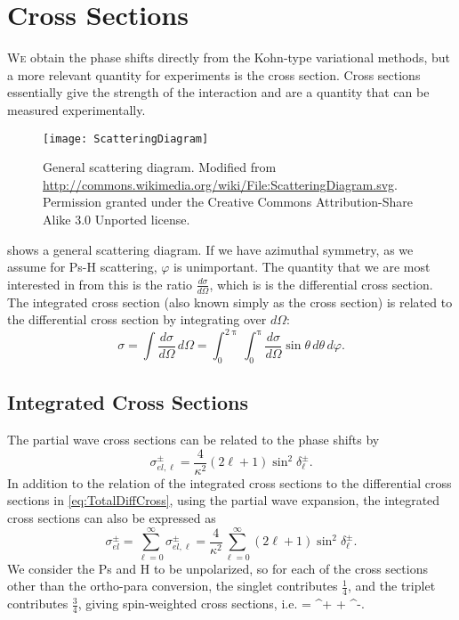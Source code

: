 \documentclass[Dissertation.tex]{subfiles}
\begin{document}
\clearpage
\pagebreak
\newpage

\chapter{Cross Sections}
\label{chp:CrossSections}

\lettrine{\textcolor{startcolor}{W}}{e} obtain the phase shifts directly from 
the Kohn-type variational methods, but a more relevant quantity for 
experiments is the cross section. Cross sections essentially give the 
strength of the interaction and are a quantity that can be measured 
experimentally.

\begin{figure}
	\centering
	\texttt{[image: ScatteringDiagram]}
	\caption[General scattering diagram]{General scattering diagram. Modified from \url{http://commons.wikimedia.org/wiki/File:ScatteringDiagram.svg}. Permission granted under the Creative Commons Attribution-Share Alike 3.0 Unported license.}
	\label{fig:ScatteringDiagram}
\end{figure}

 shows a general scattering diagram. If we have
azimuthal symmetry, as we assume for Ps-H scattering, $\varphi$ is unimportant.
The quantity that we are most interested in from this is the ratio
$\frac{d\sigma}{d\Omega}$, which is is the differential cross section.
The integrated cross section (also known simply as the cross section) is
related to the differential cross section by integrating over $d\Omega$:
\begin{equation}
\label{eq:TotalDiffCross}
\sigma = \int \frac{d\sigma}{d\Omega} \, d\Omega
 = \int_0^{2\uppi} \int_0^{\uppi} \frac{d\sigma}{d\Omega} \sin\theta \, d\theta \, d\varphi.
\end{equation}


\section{Integrated Cross Sections}
\label{sec:totalcross}

The partial wave cross sections can be 
related to the phase shifts by
\citep[p.584]{Bransden2003}
\begin{equation}
\label{eq:PartialCross}
\sigma_{el,\ell}^\pm = \frac{4}{\kappa^2} (2\ell+1) \sin^2 \delta_\ell^\pm.
\end{equation}
In addition to the relation of the integrated cross sections to the
differential cross sections in \cref{eq:TotalDiffCross},
using the partial wave expansion, the integrated cross sections can also be 
expressed as \citep[p.]{Bransden2003}
\begin{equation}
\label{eq:TotalCross}
\sigma_{el}^\pm = \sum_{\ell=0}^\infty \sigma_{el,\ell}^\pm = \frac{4}{\kappa^2} \sum_{\ell=0}^\infty (2\ell+1) \sin^2 \delta_\ell^\pm.
\end{equation}
We consider the Ps and H to be unpolarized, so
for each of the cross sections other than the ortho-para conversion, the 
singlet contributes $\frac{1}{4}$, and the triplet contributes $\frac{3}{4}$, 
giving spin-weighted cross sections, i.e. \cite{Ward1987,Blackwood2002}
\beq
\label{eq:SpinWeightCS}
\sigma =  \sigma^+ +  \sigma^-.
\eeq
\end{document}
